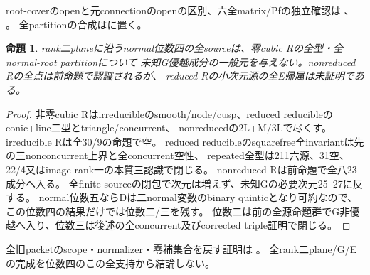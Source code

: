 \documentclass[a4paper,11pt]{ltjsarticle}
\newtheorem{proposition}{命題}[section]
\theoremstyle{definition}
\begin{document}
root-coverのopenと元connectionのopenの区別、六全matrix/Pfの独立確認は
、
。
全partitionの合成はに置く。

\begin{proposition}\label{prop:plane-ranktwo-m4-all-G}
rank二planeに沿うnormal位数四の全sourceは、零cubic Rの全型・全normal-root partitionについて
未知G優越成分の一般元を与えない。nonreduced Rの全点は前命題で認識されるが、
reduced Rの小次元源の全E帰属は未証明である。
\end{proposition}
\begin{proof}
非零cubic Rはirreducibleのsmooth/node/cusp、reduced reducibleのconic+line二型とtriangle/concurrent、
nonreducedの2L+M/3Lで尽くす。
irreducible Rは全30/9の命題で空。
reduced reducibleのsquarefree全invariantは先の三nonconcurrent上界と全concurrent空性、
repeated全型は211六源、31空、22/4又はimage-rank一の本質三認識で閉じる。
nonreduced Rは前命題で全八23成分へ入る。
全finite sourceの閉包で次元は増えず、未知Gの必要次元25--27に反する。
normal位数五ならDは二normal変数のbinary quinticとなり可約なので、この位数四の結果だけでは位数二/三を残す。
位数二は前の全源命題群でG非優越へ入り、位数三は後述の全concurrent及びcorrected triple証明で閉じる。
\end{proof}
全旧packetのscope・normalizer・零補集合を戻す証明は
。
全rank二plane/G/Eの完成を位数四のこの全支持から結論しない。
\end{document}
